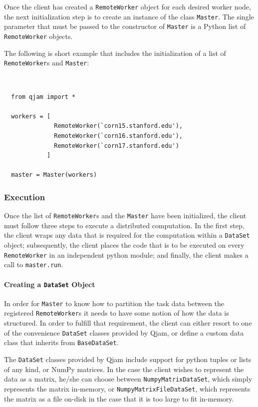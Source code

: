 \documentclass[%
  final,
  notitlepage,
  narroweqnarray,
  inline,
]{ieee}
\begin{document}
Once the client has created a \texttt{RemoteWorker} object for each desired
worker node, the next initialization step is to create an instance of the class
\texttt{Master}. The single parameter that must be passed
to the constructor of \texttt{Master} is a Python list of \texttt{RemoteWorker}
objects.

The following is short example that includes the initialization of a list
of \texttt{RemoteWorker}s and \texttt{Master}:

{\tt \small
\begin{verbatim}
  from qjam import *

  workers = [
              RemoteWorker(`corn15.stanford.edu'),
              RemoteWorker(`corn16.stanford.edu'),
              RemoteWorker(`corn17.stanford.edu')
            ]

  master = Master(workers)
\end{verbatim}}

\subsubsection{Execution}

Once the list of \texttt{RemoteWorker}s and the \texttt{Master} have been
initialized, the client must follow three steps to execute a distributed
computation. In the first step, the client wraps any data that is required for
the computation within a \texttt{DataSet} object; subsequently, the client
places the code that is to be executed on every \texttt{RemoteWorker} in an
independent python module; and finally, the client makes a call to
\texttt{master.run}.

\paragraph{Creating a \texttt{DataSet} Object}
\label{DataSets}

In order for \texttt{Master} to know how to partition the task data between the
registered \texttt{RemoteWorker}s it needs to have some notion of how the data
is structured. In order to fulfill that requirement, the client can either
resort to one of the convenience \texttt{DataSet} classes provided by Qjam, or
define a custom data class that inherits from \texttt{BaseDataSet}.

The \texttt{DataSet} classes provided by Qjam include support for python tuples
or lists of any kind, or NumPy matrices. In the case the client wishes to
represent the data as a matrix, he/she can choose between
\texttt{NumpyMatrixDataSet}, which simply represents the matrix in-memory, or
\texttt{NumpyMatrixFileDataSet}, which represents the matrix as a file on-disk
in the case that it is too large to fit in-memory.
\end{document}
